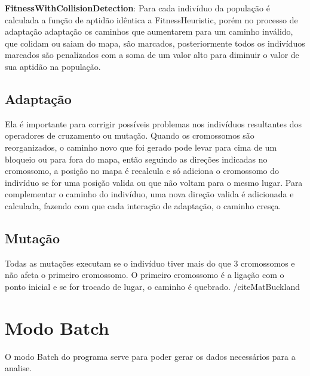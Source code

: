 \textbf{FitnessWithCollisionDetection}: Para cada indivíduo da população é calculada a função de aptidão idêntica a FitnessHeuristic, porém no processo de adaptação adaptação os caminhos que aumentarem para um caminho inválido, que colidam ou saiam do mapa, são marcados,
posteriormente todos os indivíduos marcados são penalizados com a  soma de  um valor alto para diminuir o valor de sua aptidão na população.

\subsection{Adaptação}

Ela é importante para corrigir possíveis problemas nos indivíduos resultantes dos operadores de cruzamento ou mutação. Quando os cromossomos são reorganizados, 
o caminho novo que foi gerado pode levar para cima de um bloqueio ou para fora do mapa, então seguindo as direções indicadas no cromossomo, 
a posição no mapa é recalcula e só adiciona o cromossomo do indivíduo se for uma posição valida ou que não voltam para o mesmo lugar.
Para complementar o caminho do indivíduo, uma nova direção valida é adicionada e calculada, fazendo com que cada interação de adaptação, o caminho cresça.

\subsection{Mutação}

Todas as mutações executam se o indivíduo tiver mais do que 3 cromossomos e não afeta o primeiro cromossomo.
O primeiro cromossomo é a ligação com o ponto inicial e se for trocado de lugar, o caminho é quebrado. /cite{MatBuckland}

\section{Modo Batch}

O modo Batch do programa serve para poder gerar os dados necessários para a analise.
